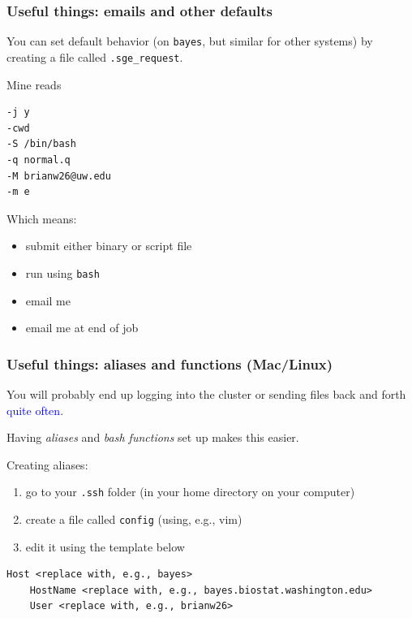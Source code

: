 \documentclass[12pt, 
hyperref={colorlinks=true, linkcolor=BlueViolet, urlcolor=BlueViolet},dvipsnames]{beamer}
\begin{document}
\begin{frame}[fragile]
\frametitle{Useful things: emails and other defaults}
You can set default behavior (on \texttt{bayes}, but similar for other systems) by creating a file called \texttt{.sge\_request}. 

Mine reads \vspace{-0.3cm}
\begin{verbatim}
-j y
-cwd
-S /bin/bash
-q normal.q
-M brianw26@uw.edu
-m e
\end{verbatim}

Which means: \vspace{-0.3cm}
\begin{itemize}
\item submit either binary or script file
\item run using \texttt{bash}
\item email me
\item email me at end of job
\end{itemize}
\end{frame}

\begin{frame}[fragile]
\frametitle{Useful things: aliases and functions (Mac/Linux)}
You will probably end up logging into the cluster or sending files back and forth \textcolor{blue}{quite often}.

Having \textit{aliases} and \textit{bash functions} set up makes this easier.

Creating aliases: \vspace{-0.3cm} 
\begin{enumerate}
\item go to your \texttt{.ssh} folder (in your home directory on your computer)
\item create a file called \texttt{config} (using, e.g., vim)
\item edit it using the template below
\end{enumerate} \vspace{-0.3cm}
{\scriptsize
\begin{verbatim}
Host <replace with, e.g., bayes>
    HostName <replace with, e.g., bayes.biostat.washington.edu>
    User <replace with, e.g., brianw26>
\end{verbatim}
}
\end{frame}
\end{document}
